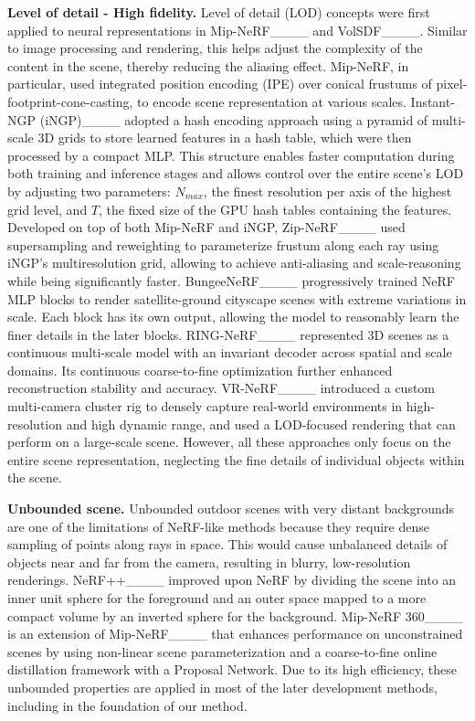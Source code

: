 \textbf{Level of detail - High fidelity.} Level of detail (LOD) concepts were first applied to neural representations in Mip-NeRF____ and VolSDF____. Similar to image processing and rendering, this helps adjust the complexity of the content in the scene, thereby reducing the aliasing effect.
Mip-NeRF, in particular, used integrated position encoding (IPE) over conical frustums of pixel-footprint-cone-casting, to encode scene representation at various scales.
Instant-NGP (iNGP)____ adopted a hash encoding approach using a pyramid of multi-scale 3D grids to store learned features in a hash table, which were then processed by a compact MLP. This structure enables faster computation during both training and inference stages and allows control over the entire scene's LOD by adjusting two parameters: $N_{max}$, the finest resolution per axis of the highest grid level, and $T$, the fixed size of the GPU hash tables containing the features.
Developed on top of both Mip-NeRF and iNGP, Zip-NeRF____ used supersampling and reweighting to parameterize frustum along each ray using iNGP’s multiresolution grid, allowing to achieve anti-aliasing and scale-reasoning while being significantly faster.
BungeeNeRF____ progressively trained NeRF MLP blocks to render satellite-ground cityscape scenes with extreme variations in scale. Each block has its own output, allowing the model to reasonably learn the finer details in the later blocks.
RING-NeRF____ represented 3D scenes as a continuous multi-scale model with an invariant decoder across spatial and scale domains. 
Its continuous coarse-to-fine optimization further enhanced reconstruction stability and accuracy.
VR-NeRF____ introduced a custom multi-camera cluster rig to densely capture real-world environments in high-resolution and high dynamic range, and used a LOD-focused rendering that can perform on a large-scale scene.
However, all these approaches only focus on the entire scene representation, neglecting the fine details of individual objects within the scene.

\textbf{Unbounded scene.} Unbounded outdoor scenes with very distant backgrounds are one of the limitations of NeRF-like methods because they require dense sampling of points along rays in space.
This would cause unbalanced details of objects near and far from the camera, resulting in blurry, low-resolution renderings.
NeRF++____ improved upon NeRF by dividing the scene into an inner unit sphere for the foreground and an outer space mapped to a more compact volume by an inverted sphere for the background.
Mip-NeRF 360____ is an extension of Mip-NeRF____ that enhances performance on unconstrained scenes by using non-linear scene parameterization and a coarse-to-fine online distillation framework with a Proposal Network.
Due to its high efficiency, these unbounded properties are applied in most of the later development methods, including in the foundation of our method.

